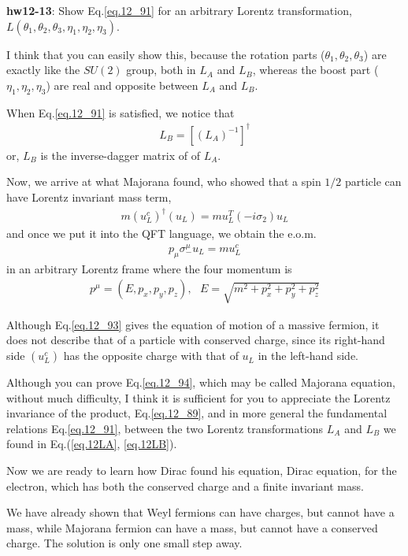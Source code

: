 \documentclass[12pt]{article}
\begin{document}
{\bf hw12-13}: Show Eq.\ref{eq.12_91} for an arbitrary Lorentz transformation,
  $L(\theta_1,\theta_2,\theta_3,\eta_1,\eta_2,\eta_3)$.

  I think that you can easily show this, because the rotation parts
  ($\theta_1,\theta_2,\theta_3$) are exactly like the $SU(2)$ group, both in $L_A$ and
  $L_B$, whereas the boost part ($\eta_1,\eta_2,\eta_3$) are real and opposite
  between $L_A$ and $L_B$.

  When Eq.\ref{eq.12_91} is satisfied, we notice that
\begin{eqnarray}
  L_B = [(L_A)^{-1}]^\dagger \label{eq.12_92}
\end{eqnarray}
   or, $L_B$ is the inverse-dagger matrix of of $L_A$.

  Now, we arrive at what Majorana found, who showed that a spin $1/2$
  particle can have Lorentz invariant mass term,
\begin{eqnarray}
  m (u_L^c)^\dagger (u_L) = m u_L^T (-i\sigma_2) u_L \label{eq.12_93}
\end{eqnarray}
  and once we put it into the QFT language, we obtain the e.o.m.
\begin{eqnarray}
  p_\mu \sigma_-^\mu u_L = m u_L^c \label{eq.12_94}
\end{eqnarray}
  in an arbitrary Lorentz frame where the four momentum is
\begin{eqnarray}
  p^\mu = (E, p_x, p_y, p_z), ~~~E = \sqrt{m^2+p_x^2+p_y^2+p_z^2} \label{eq.12_95}
\end{eqnarray}

  Although Eq.\ref{eq.12_93} gives the equation of motion of a massive fermion,
  it does not describe that of a particle with conserved charge,
  since its right-hand side $(u_L^c)$ has the opposite charge with that
  of $u_L$ in the left-hand side.

  Although you can prove Eq.\ref{eq.12_94}, which may be called Majorana equation, without much difficulty, I think it is sufficient for you to
  appreciate the Lorentz invariance of the product, Eq.\ref{eq.12_89}, and in more general the fundamental relations Eq.\ref{eq.12_91}, between the two Lorentz transformations $L_A$ and $L_B$ we found in Eq.(\ref{eq.12LA}, \ref{eq.12LB}).


  Now we are ready to learn how Dirac found his equation, Dirac equation,
  for the electron, which has both the conserved charge and a finite
  invariant mass.

  We have already shown that Weyl fermions can have charges, but cannot
  have a mass, while Majorana fermion can have a mass, but cannot have
  a conserved charge.  The solution is only one small step away.
\end{document}
